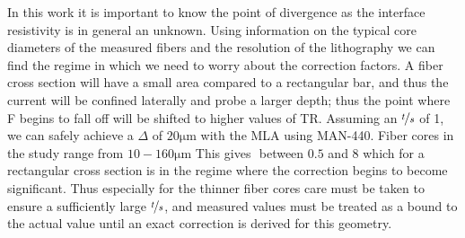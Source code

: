 In this work it is important to know the point of divergence as the interface resistivity is in general an unknown. Using information on the typical core diameters of the measured fibers and the resolution of the lithography we can find the regime in which we need to worry about the correction factors. A fiber cross section will have a small area compared to a rectangular bar, and thus the current will be confined laterally and probe a larger depth; thus the point where F begins to fall off will be shifted to higher values of TR. Assuming an $\nicefrac{t}{s}$ of 1, we can safely achieve a $\Delta$ of $20\si{\micro\meter}$ with the MLA using MAN-440. Fiber cores in the study range from  $10-160 \si{\micro\meter}$ This gives $ $ between $0.5$ and $8$ which for a rectangular cross section is in the regime where the correction begins to become significant. Thus especially for the thinner fiber cores care must be taken to ensure a sufficiently large $\nicefrac{t}{s}$, and measured values must be treated as a bound to the actual value until an exact correction is derived for this geometry.  
\cleardoublepage
